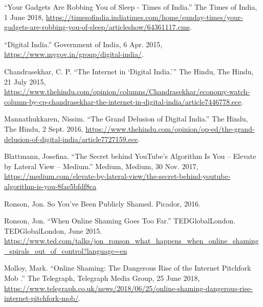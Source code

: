 \documentclass[a4paper, 11pt]{article}
\begin{document}
\begin{thebibliography}{X}
  “Your Gadgets Are Robbing You of Sleep - Times of India.” The Times of India, 1 June 2018, \href{https://timesofindia.indiatimes.com/home/sunday-times/your-gadgets-are-robbing-you-of-sleep/articleshow/64361117.cms}{https://timesofindia.indiatimes.com/home/sunday-times/your-gadgets-are-robbing-you-of-sleep/articleshow/64361117.cms}.

  “Digital India.” Government of India, 6 Apr. 2015, \href{https://www.mygov.in/group/digital-india/}{https://www.mygov.in/group/digital-india/}.

  Chandrasekhar, C. P. “The Internet in ‘Digital India.’” The Hindu, The Hindu, 21 July 2015, \href{https://www.thehindu.com/opinion/columns/Chandrasekhar/economy-watch-column-by-cp-chandrasekhar-the-internet-in-digital-india/article7446778.ece}{https://www.thehindu.com/opinion/columns/Chandrasekhar/economy-watch-column-by-cp-chandrasekhar-the-internet-in-digital-india/article7446778.ece}.

  Mannathukkaren, Nissim. “The Grand Delusion of Digital India.” The Hindu, The Hindu, 2 Sept. 2016, \href{https://www.thehindu.com/opinion/op-ed/the-grand-delusion-of-digital-india/article7727159.ece}{https://www.thehindu.com/opinion/op-ed/the-grand-delusion-of-digital-india/article7727159.ece}.

  Blattmann, Josefina. “The Secret behind YouTube's Algorithm Is You – Elevate by Lateral View – Medium.” Medium, Medium, 30 Nov. 2017, \href{https://medium.com/elevate-by-lateral-view/the-secret-behind-youtube-algorithm-is-you-8fae5bfdf8ca}{https://medium.com/elevate-by-lateral-view/the-secret-behind-youtube-algorithm-is-you-8fae5bfdf8ca}

  Ronson, Jon. So You've Been Publicly Shamed. Picador, 2016.

  Ronson, Jon. “When Online Shaming Goes Too Far.” TEDGlobalLondon. TEDGlobalLondon, June 2015.
  \href{https://www.ted.com/talks/jon\_ronson\_what\_happens\_when\_online\_shaming\_spirals\_out\_of\_control?language=en}{https://www.ted.com/talks/jon\_ronson\_what\_happens\_when\_online\_shaming\_spirals\_out\_of\_control?language=en}

  Molloy, Mark. “Online Shaming: The Dangerous Rise of the Internet Pitchfork Mob   .” The Telegraph, Telegraph Media Group, 25 June 2018, \href{https://www.telegraph.co.uk/news/2018/06/25/online-shaming-dangerous-rise-internet-pitchfork-mob/}{https://www.telegraph.co.uk/news/2018/06/25/online-shaming-dangerous-rise-internet-pitchfork-mob/}.


\end{thebibliography}
\end{document}
